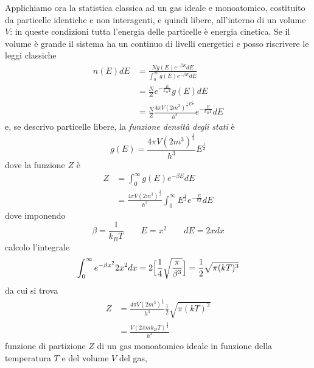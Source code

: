 Applichiamo ora la statistica classica ad un gas ideale e monoatomico, costituito da particelle identiche e non interagenti, e quindi libere, all'interno di un volume $V$: in queste condizioni tutta l'energia delle particelle è energia cinetica.
Se il volume è grande il sistema ha un continuo di livelli energetici e posso riscrivere le leggi classiche
\begin{equation}
\begin{split}
n(E)dE & = \frac{N g(E) e^{-\beta E} dE}{\int_0^\infty g(E) e^{-\beta E} dE } \\
& = \frac{N}{Z} e^{ -\frac{E}{k_B T} } g(E) dE \\
& = \frac{N}{Z} \frac{4\pi V (2m^3)^{ \frac{1}{2} E^{ \frac{1}{2} } }}{h^3} e^{ -\frac{E}{k_B T} }dE
\label{numero_particelle}
\end{split}
\end{equation}
e, se descrivo particelle libere, la \textit{funzione densità degli stati} è 
\begin{equation}
g(E) = \frac{4 \pi V (2m^3)^{ \frac{1}{2} }}{h^3} E^{ \frac{1}{2} }
\label{fun_den_stat}
\end{equation}
dove la funzione $Z$ è
\begin{equation}
\begin{split}
Z & = \int_0^{\infty} g(E) e^{ -\beta E } dE \\
& = \frac{4\pi V (2m^3)^{\frac{1}{2}}}{h^3} \int_0^{\infty} E^{ \frac{1}{2} } e^{-\frac{E}{kT} } dE
\end{split}
\end{equation}
dove imponendo
\begin{equation}
\beta = \frac{1}{k_B T} \quad\quad E = x^2 \quad\quad dE=2x dx
\end{equation}
calcolo l'integrale
\begin{equation}
\int_0^{\infty} e^{ -\beta x^2 } 2 x^2 dx = 2 \Bigl[  \frac{1}{4} \sqrt{\frac{\pi}{\beta^3}}  \Bigr] = \frac{1}{2} \sqrt{\pi (kT)^3}
\end{equation}
da cui si trova
\begin{equation}
\begin{split}
Z &= \frac{4\pi V (2m^3)^{\frac{1}{2}}}{h^3} \frac{1}{2} \sqrt{\pi (kT)^3} \\
& = \frac{V (2\pi m k_B T)^{ \frac{3}{2} }}{h^3}
\label{funzione_partizione_gasmono}
\end{split}
\end{equation}
funzione di partizione $Z$ di un gas monoatomico ideale in funzione della temperatura $T$ e del volume $V$ del gas, 
